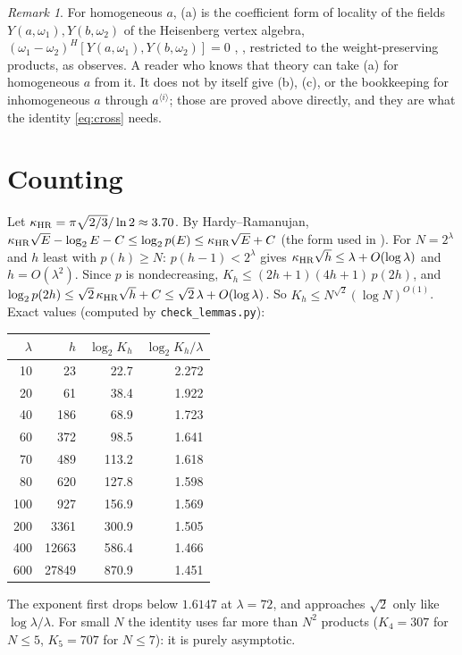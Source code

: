 \documentclass[11pt]{amsart}
\theoremstyle{remark}
\newtheorem{remark}[theorem]{Remark}
\begin{document}
\begin{remark}\label{rem:locality}
For homogeneous $a$, (a) is the coefficient form of locality of the fields $Y(a,\omega_1),Y(b,\omega_2)$ of the
Heisenberg vertex algebra, $(\omega_1-\omega_2)^H[Y(a,\omega_1),Y(b,\omega_2)]=0$ \cite[\S2.1 and Prop.~2.4]{Fre},
\cite[Def.~1.5.1]{MN}, restricted to the weight-preserving products, as \cite[App.~H]{ETH} observes. A reader who
knows that theory can take (a) for homogeneous $a$ from it. It does not by itself give (b), (c), or the bookkeeping
for inhomogeneous $a$ through $a^{\langle i\rangle}$; those are proved above directly, and they are what the identity
\eqref{eq:cross} needs.
\end{remark}

\section{Counting}\label{sec:count}
Let $\kappa_{\rm HR}=\pi\sqrt{2/3}/\ln2\approx3.70$. By Hardy--Ramanujan, $\kappa_{\rm HR}\sqrt E-\log_2E-C\le\log_2p(E)\le\kappa_{\rm HR}\sqrt E+C$
(the form used in \cite[(46)]{ETH}). For $N=2^\lambda$ and $h$ least with $p(h)\ge N$: $p(h-1)<2^\lambda$ gives
$\kappa_{\rm HR}\sqrt h\le\lambda+O(\log\lambda)$ and $h=O(\lambda^2)$. Since $p$ is nondecreasing,
$K_h\le(2h+1)(4h+1)\,p(2h)$, and $\log_2p(2h)\le\sqrt2\,\kappa_{\rm HR}\sqrt h+C\le\sqrt2\,\lambda+O(\log\lambda)$. So
$K_h\le N^{\sqrt2}(\log N)^{O(1)}$. Exact values (computed by \texttt{check\_lemmas.py}):

\begin{center}
\begin{tabular}{rrrr}
\toprule
$\lambda$ & $h$ & $\log_2K_h$ & $\log_2K_h/\lambda$\\
\midrule
10 & 23 & 22.7 & 2.272\\
20 & 61 & 38.4 & 1.922\\
40 & 186 & 68.9 & 1.723\\
60 & 372 & 98.5 & 1.641\\
70 & 489 & 113.2 & 1.618\\
80 & 620 & 127.8 & 1.598\\
100 & 927 & 156.9 & 1.569\\
200 & 3361 & 300.9 & 1.505\\
400 & 12663 & 586.4 & 1.466\\
600 & 27849 & 870.9 & 1.451\\
\bottomrule
\end{tabular}
\end{center}
The exponent first drops below $1.6147$ at $\lambda=72$, and approaches $\sqrt2$ only like $\log\lambda/\lambda$. For small $N$
the identity uses far more than $N^2$ products ($K_4=307$ for $N\le5$, $K_5=707$ for $N\le7$): it is purely asymptotic.
\end{document}
